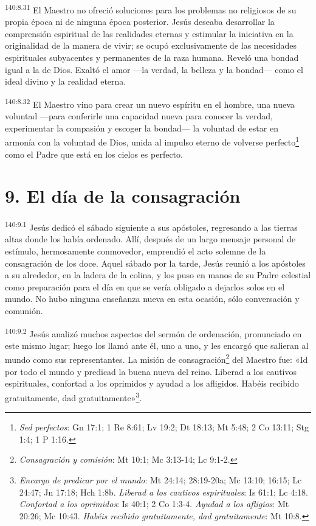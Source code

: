 \par 
\textsuperscript{140:8.31} El Maestro no ofreció soluciones para los problemas no religiosos de su propia época ni de ninguna época posterior. Jesús deseaba desarrollar la comprensión espiritual de las realidades eternas y estimular la iniciativa en la originalidad de la manera de vivir; se ocupó exclusivamente de las necesidades espirituales subyacentes y permanentes de la raza humana. Reveló una bondad igual a la de Dios. Exaltó el amor ---la verdad, la belleza y la bondad--- como el ideal divino y la realidad eterna.

\par 
\textsuperscript{140:8.32} El Maestro vino para crear un nuevo espíritu en el hombre, una nueva voluntad ---para conferirle una capacidad nueva para conocer la verdad, experimentar la compasión y escoger la bondad--- la voluntad de estar en armonía con la voluntad de Dios, unida al impulso eterno de volverse perfecto\footnote{\textit{Sed perfectos}: Gn 17:1; 1 Re 8:61; Lv 19:2; Dt 18:13; Mt 5:48; 2 Co 13:11; Stg 1:4; 1 P 1:16.} como el Padre que está en los cielos es perfecto.

\section*{9. El día de la consagración}
\par 
\textsuperscript{140:9.1} Jesús dedicó el sábado siguiente a sus apóstoles, regresando a las tierras altas donde los había ordenado. Allí, después de un largo mensaje personal de estímulo, hermosamente conmovedor, emprendió el acto solemne de la consagración de los doce. Aquel sábado por la tarde, Jesús reunió a los apóstoles a su alrededor, en la ladera de la colina, y los puso en manos de su Padre celestial como preparación para el día en que se vería obligado a dejarlos solos en el mundo. No hubo ninguna enseñanza nueva en esta ocasión, sólo conversación y comunión.

\par 
\textsuperscript{140:9.2} Jesús analizó muchos aspectos del sermón de ordenación, pronunciado en este mismo lugar; luego los llamó ante él, uno a uno, y les encargó que salieran al mundo como sus representantes. La misión de consagración\footnote{\textit{Consagración y comisión}: Mt 10:1; Mc 3:13-14; Lc 9:1-2.} del Maestro fue: «Id por todo el mundo y predicad la buena nueva del reino. Liberad a los cautivos espirituales, confortad a los oprimidos y ayudad a los afligidos. Habéis recibido gratuitamente, dad gratuitamente»\footnote{\textit{Encargo de predicar por el mundo}: Mt 24:14; 28:19-20a; Mc 13:10; 16:15; Lc 24:47; Jn 17:18; Hch 1:8b. \textit{Liberad a los cautivos espirituales}: Is 61:1; Lc 4:18. \textit{Confortad a los oprimidos}: Is 40:1; 2 Co 1:3-4. \textit{Ayudad a los afligios}: Mt 20:26; Mc 10:43. \textit{Habéis recibido gratuitamente, dad gratuitamente}: Mt 10:8.}.

